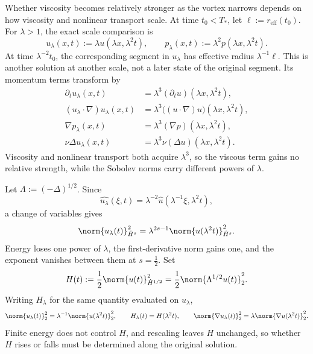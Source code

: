 
Whether viscosity becomes relatively stronger as the vortex narrows depends on how viscosity and nonlinear transport scale.
At time \(t_0<T_*\), let \(\ell:=r_{\mathrm{eff}}(t_0)\). For \(\lambda>1\), the exact scale comparison is
\[
  u_\lambda(x,t)
  :=
  \lambda u(\lambda x,\lambda^2t),
  \qquad
  p_\lambda(x,t)
  :=
  \lambda^2p(\lambda x,\lambda^2t).
\]
At time \(\lambda^{-2}t_0\), the corresponding segment in \(u_\lambda\) has effective radius \(\lambda^{-1}\ell\). This is another solution at another scale, not a later state of the original segment. Its momentum terms transform by
\[
\begin{aligned}
  \partial_tu_\lambda(x,t)
  &=
  \lambda^3(\partial_tu)(\lambda x,\lambda^2t),
  \\
  (u_\lambda\cdot\nabla)u_\lambda(x,t)
  &=
  \lambda^3\bigl((u\cdot\nabla)u\bigr)(\lambda x,\lambda^2t),
  \\
  \nabla p_\lambda(x,t)
  &=
  \lambda^3(\nabla p)(\lambda x,\lambda^2t),
  \\
  \nu\Delta u_\lambda(x,t)
  &=
  \lambda^3\nu(\Delta u)(\lambda x,\lambda^2t).
\end{aligned}
\]
Viscosity and nonlinear transport both acquire \(\lambda^3\), so the viscous term gains no relative strength, while the Sobolev norms carry different powers of \(\lambda\).


Let \(\Lambda:=(-\Delta)^{1/2}\). Since
\[
  \widehat{u_\lambda}(\xi,t)
  =
  \lambda^{-2}\widehat u(\lambda^{-1}\xi,\lambda^2t),
\]
a change of variables gives
\[
  \norm{u_\lambda(t)}_{\dot H^s}^2
  =
  \lambda^{2s-1}
  \norm{u(\lambda^2t)}_{\dot H^s}^2.
\]
Energy loses one power of \(\lambda\), the first-derivative norm gains one, and the exponent vanishes between them at \(s=\tfrac12\). Set
\[
  H(t)
  :=
  \frac12\norm{u(t)}_{\dot H^{1/2}}^2
  =
  \frac12\norm{\Lambda^{1/2}u(t)}_2^2.
\]
Writing \(H_\lambda\) for the same quantity evaluated on \(u_\lambda\),
\[
  \norm{u_\lambda(t)}_2^2
  =
  \lambda^{-1}\norm{u(\lambda^2t)}_2^2,
  \qquad
  H_\lambda(t)=H(\lambda^2t),
  \qquad
  \norm{\nabla u_\lambda(t)}_2^2
  =
  \lambda\norm{\nabla u(\lambda^2t)}_2^2.
\]
Finite energy does not control \(H\), and rescaling leaves \(H\) unchanged, so whether \(H\) rises or falls must be determined along the original solution.



